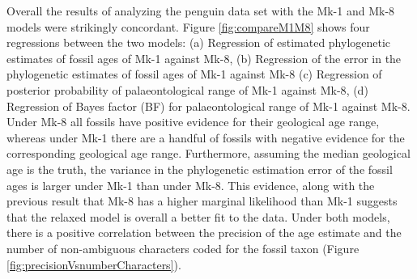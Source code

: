 \documentclass[11pt]{article}
\newcommand{\Mstrict}{{Mk-1}}
\newcommand{\Mrelaxed}{{Mk-8}}
\begin{document}
Overall the results of analyzing the penguin data set with the \Mstrict{} and \Mrelaxed{} models were strikingly concordant. 
Figure \ref{fig:compareM1M8} shows four regressions between the two models: (a) Regression of estimated phylogenetic estimates of fossil ages of \Mstrict{} against \Mrelaxed{}, (b) Regression of the error in the phylogenetic estimates of fossil ages of \Mstrict{} against \Mrelaxed{} (c) Regression of posterior probability of palaeontological range of \Mstrict{} against \Mrelaxed{}, (d) Regression of Bayes factor (BF) for palaeontological range of \Mstrict{} against \Mrelaxed{}. 
Under \Mrelaxed{} all fossils have positive evidence for their geological age range, whereas under \Mstrict{} there are a handful of fossils with negative evidence for the corresponding geological age range. Furthermore, assuming the median geological age is the truth, the variance in the phylogenetic estimation error of the fossil ages is larger under \Mstrict{} than under \Mrelaxed{}.
This evidence, along with the previous result that \Mrelaxed{} has a higher marginal likelihood than \Mstrict{} \cite{gavryushkina2015bayesian} suggests that the relaxed model is overall a better fit to the data. 
Under both models, there is a positive correlation between the precision of the age estimate and the number of non-ambiguous characters coded for the fossil taxon (Figure \ref{fig:precisionVsnumberCharacters}).
\end{document}
